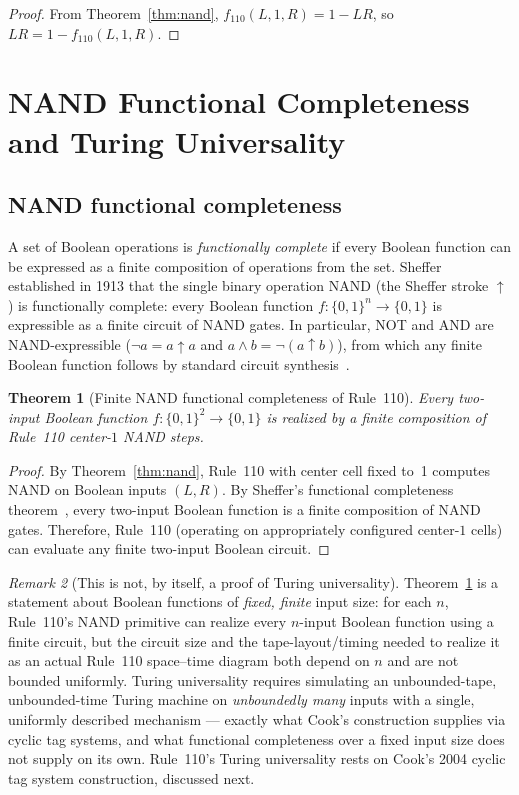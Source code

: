\documentclass[11pt]{article}
\newtheorem{theorem}{Theorem}[section]
\theoremstyle{remark}
\newtheorem{remark}[theorem]{Remark}
\begin{document}
\begin{proof}
From Theorem~\ref{thm:nand}, $f_{110}(L,1,R) = 1 - LR$, so $LR = 1 - f_{110}(L,1,R)$.
\end{proof}

\section{NAND Functional Completeness and Turing Universality}
\label{sec:universality}

\subsection{NAND functional completeness}

A set of Boolean operations is \emph{functionally complete} if every Boolean function
can be expressed as a finite composition of operations from the set.
Sheffer~\cite{Sheffer1913} established in 1913 that the single binary operation
NAND (the Sheffer stroke $\uparrow$) is functionally complete: every Boolean function
$f : \{0,1\}^n \to \{0,1\}$ is expressible as a finite circuit of NAND gates.
In particular, NOT and AND are NAND-expressible ($\neg a = a \uparrow a$ and
$a \wedge b = \neg(a \uparrow b)$), from which any finite Boolean function follows by
standard circuit synthesis~\cite{Shannon1938}.

\begin{theorem}[Finite NAND functional completeness of Rule~110]
\label{thm:universal}
Every two-input Boolean function $f : \{0,1\}^2 \to \{0,1\}$ is realized by a finite
composition of Rule~110 center-$1$ NAND steps.
\end{theorem}

\begin{proof}
By Theorem~\ref{thm:nand}, Rule~110 with center cell fixed to~1 computes NAND
on Boolean inputs $(L,R)$.
By Sheffer's functional completeness theorem~\cite{Sheffer1913}, every two-input
Boolean function is a finite composition of NAND gates.
Therefore, Rule~110 (operating on appropriately configured center-$1$ cells)
can evaluate any finite two-input Boolean circuit.
\end{proof}

\begin{remark}[This is not, by itself, a proof of Turing universality]
\label{rem:not-universality}
Theorem~\ref{thm:universal} is a statement about Boolean functions of \emph{fixed,
finite} input size: for each $n$, Rule~110's NAND primitive can realize every
$n$-input Boolean function using a finite circuit, but the circuit size and the
tape-layout/timing needed to realize it as an actual Rule~110 space--time diagram
both depend on $n$ and are not bounded uniformly.
Turing universality requires simulating an unbounded-tape, unbounded-time Turing
machine on \emph{unboundedly many} inputs with a single, uniformly described
mechanism --- exactly what Cook's construction supplies via cyclic tag systems, and
what functional completeness over a fixed input size does not supply on its own.
Rule~110's Turing universality rests on Cook's 2004 cyclic tag system
construction, discussed next.
\end{remark}
\end{document}
